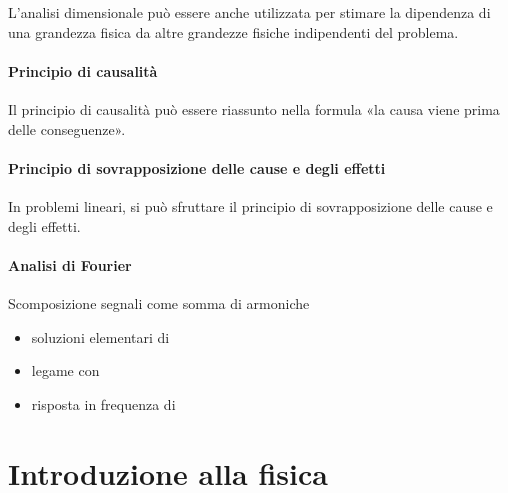\documentclass[letterpaper,10pt,italian]{jupyterBook}
\begin{document}
\sphinxAtStartPar
L’analisi dimensionale può essere anche utilizzata per stimare la dipendenza di una grandezza fisica da altre grandezze fisiche indipendenti del problema.


\subsection{Principio di causalità}
\label{\detokenize{ch/todo:principio-di-causalita}}\label{\detokenize{ch/todo:physics-hs-todo-causality}}
\sphinxAtStartPar
Il principio di causalità può essere riassunto nella formula «la causa viene prima delle conseguenze».


\subsection{Principio di sovrapposizione delle cause e degli effetti}
\label{\detokenize{ch/todo:principio-di-sovrapposizione-delle-cause-e-degli-effetti}}\label{\detokenize{ch/todo:physics-hs-todo-psce}}
\sphinxAtStartPar
In problemi lineari, si può sfruttare il principio di sovrapposizione delle cause e degli effetti.


\subsection{Analisi di Fourier}
\label{\detokenize{ch/todo:analisi-di-fourier}}\label{\detokenize{ch/todo:physics-hs-todo-fourier}}
\sphinxAtStartPar
Scomposizione segnali come somma di armoniche
\begin{itemize}
\item {} 
\sphinxAtStartPar
soluzioni elementari di {\hyperref[\detokenize{ch/waves/intro:physics-hs-waves-intro}]{}}

\item {} 
\sphinxAtStartPar
legame con 

\item {} 
\sphinxAtStartPar
risposta in frequenza di {\hyperref[\detokenize{ch/intro/measurements:physics-hs-intro-measurements-order}]{}}

\end{itemize}

\sphinxstepscope


\part{Introduzione alla fisica}
\end{document}

